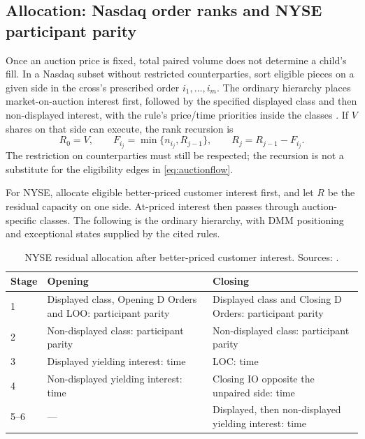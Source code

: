 \documentclass[11pt]{article}
\numberwithin{equation}{section}
\theoremstyle{definition}
\theoremstyle{remark}
\theoremstyle{definition}
\begin{document}
\subsection{Allocation: Nasdaq order ranks and NYSE participant parity}

Once an auction price is fixed, total paired volume does not determine a child's
fill. In a Nasdaq subset without restricted counterparties, sort eligible
pieces on a given side in the cross's prescribed order $i_1,\ldots,i_m$. The
ordinary hierarchy places market-on-auction interest first, followed by the
specified displayed class and then non-displayed interest, with the rule's
price/time priorities inside the classes \citep{nasdaqrules}. If $V$ shares on
that side can execute, the rank recursion is
\begin{equation}\label{eq:auctionfifo}
 R_0=V,\qquad F_{i_j}=\min\{n_{i_j},R_{j-1}\},\qquad
 R_j=R_{j-1}-F_{i_j}.
\end{equation}
The restriction on counterparties must still be respected; the recursion is
not a substitute for the eligibility edges in \eqref{eq:auctionflow}.

For NYSE, allocate eligible better-priced customer interest first, and let
$R$ be the residual capacity on one side. At-priced interest then passes through
auction-specific classes. The following is the ordinary hierarchy, with DMM
positioning and exceptional states supplied by the cited rules.

\begin{table}[tb]
\centering\small
\caption{NYSE residual allocation after better-priced customer interest.
Sources: \citet{nyseopenrule,nysecloserule}.}
\label{tab:nyseauctionpriority}
\begin{tabularx}{\textwidth}{p{}YY}
\toprule Stage & Opening & Closing \\ & Displayed class, Opening D Orders and LOO: participant parity & Displayed class and Closing D Orders: participant parity \\
2 & Non-displayed class: participant parity & Non-displayed class: participant parity \\
3 & Displayed yielding interest: time & LOC: time \\
4 & Non-displayed yielding interest: time & Closing IO opposite the unpaired side: time \\
5--6 & --- & Displayed, then non-displayed yielding interest: time \\
\bottomrule
\end{tabularx}
\end{table}
\end{document}
